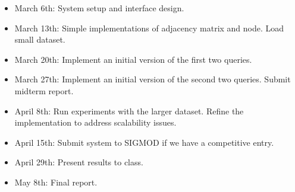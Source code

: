 \documentclass{article}
\begin{document}
\begin{itemize}
\item March 6th: System setup and interface design.
\item March 13th: Simple implementations of adjacency matrix and node. Load small dataset.
\item March 20th: Implement an initial version of the first two queries.
\item March 27th: Implement an initial version of the second two queries. Submit midterm report.
\item April 8th: Run experiments with the larger dataset. Refine the implementation to address scalability issues.
\item April 15th: Submit system to SIGMOD if we have a competitive entry.
\item April 29th: Present results to class.
\item May 8th: Final report.
\end{itemize}



\end{document}
